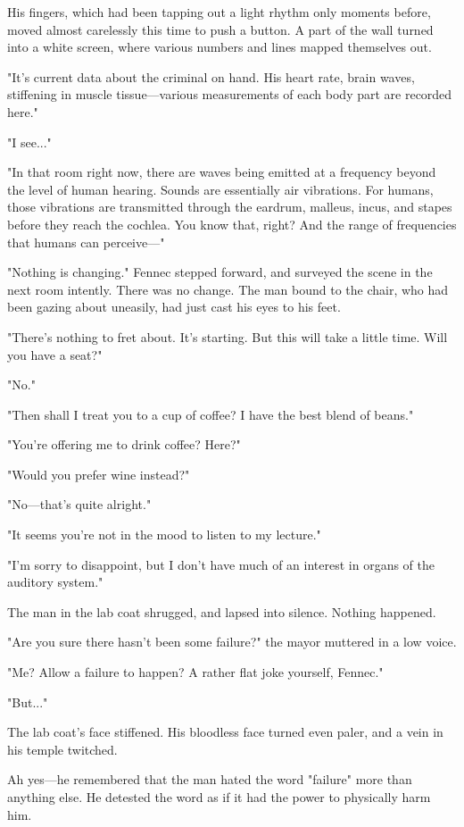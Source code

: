 His fingers, which had been tapping out a light rhythm only moments
before, moved almost carelessly this time to push a button. A part of
the wall turned into a white screen, where various numbers and lines
mapped themselves out.

"It's current data about the criminal on hand. His heart rate, brain
waves, stiffening in muscle tissue---various measurements of each body
part are recorded here."

"I see..."

"In that room right now, there are waves being emitted at a frequency
beyond the level of human hearing. Sounds are essentially air
vibrations. For humans, those vibrations are transmitted through the
eardrum, malleus, incus, and stapes before they reach the cochlea. You
know that, right? And the range of frequencies that humans can
perceive---"

"Nothing is changing." Fennec stepped forward, and surveyed the scene in
the next room intently. There was no change. The man bound to the chair,
who had been gazing about uneasily, had just cast his eyes to his feet.

"There's nothing to fret about. It's starting. But this will take a
little time. Will you have a seat?"

"No."

"Then shall I treat you to a cup of coffee? I have the best blend of
beans."

"You're offering me to drink coffee? Here?"

"Would you prefer wine instead?"

"No---that's quite alright."

"It seems you're not in the mood to listen to my lecture."

"I'm sorry to disappoint, but I don't have much of an interest in organs
of the auditory system."

The man in the lab coat shrugged, and lapsed into silence. Nothing
happened.

"Are you sure there hasn't been some failure?" the mayor muttered in a
low voice.

"Me? Allow a failure to happen? A rather flat joke yourself, Fennec."

"But..."

The lab coat's face stiffened. His bloodless face turned even paler, and
a vein in his temple twitched.

Ah yes---he remembered that the man hated the word "failure" more than
anything else. He detested the word as if it had the power to physically
harm him.

